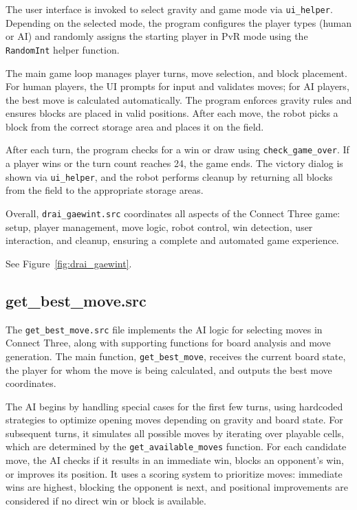 \documentclass{article}
\begin{document}
            The user interface is invoked to select gravity and game mode via \texttt{ui\_helper}. Depending on the selected mode, the program configures the player types (human or AI) and randomly assigns the starting player in PvR mode using the \texttt{RandomInt} helper function.

            The main game loop manages player turns, move selection, and block placement. For human players, the UI prompts for input and validates moves; for AI players, the best move is calculated automatically. The program enforces gravity rules and ensures blocks are placed in valid positions. After each move, the robot picks a block from the correct storage area and places it on the field.

            After each turn, the program checks for a win or draw using \texttt{check\_game\_over}. If a player wins or the turn count reaches 24, the game ends. The victory dialog is shown via \texttt{ui\_helper}, and the robot performs cleanup by returning all blocks from the field to the appropriate storage areas.

            Overall, \texttt{drai\_gaewint.src} coordinates all aspects of the Connect Three game\@: setup, player management, move logic, robot control, win detection, user interaction, and cleanup, ensuring a complete and automated game experience.

            See Figure~\ref{fig:drai_gaewint}.

        \subsection{get\_best\_move.src}
            The \texttt{get\_best\_move.src} file implements the AI logic for selecting moves in Connect Three, along with supporting functions for board analysis and move generation. The main function, \texttt{get\_best\_move}, receives the current board state, the player for whom the move is being calculated, and outputs the best move coordinates.

            The AI begins by handling special cases for the first few turns, using hardcoded strategies to optimize opening moves depending on gravity and board state. For subsequent turns, it simulates all possible moves by iterating over playable cells, which are determined by the \texttt{get\_available\_moves} function. For each candidate move, the AI checks if it results in an immediate win, blocks an opponent's win, or improves its position. It uses a scoring system to prioritize moves: immediate wins are highest, blocking the opponent is next, and positional improvements are considered if no direct win or block is available.
\end{document}
